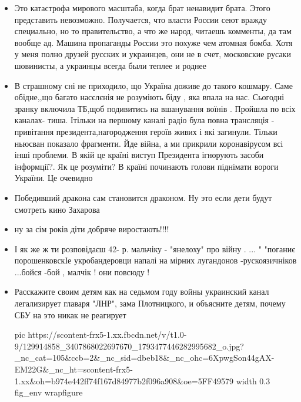\begin{itemize}
\item {} 

Это катастрофа мирового масштаба, когда брат ненавидит брата. Этого представить
невозможно. Получается, что власти России сеют вражду
специально, но то правительство, а что же народ, читаешь
комменты, да там вообще ад. Машина пропаганды России это похуже
чем атомная бомба. Хотя у меня полно друзей русских и
украинцев, они не в счет, московские русаки шовинисты, а
украинцы всегда были теплее и роднее

\item {}

В страшному сні не приходило, що Україна доживе до такого кошмару. Саме
обідне,,що багато насєлєнія не розуміють біду , яка впала на
нас. Сьогодні зранку включила ТБ,щоб подивитись на вшанування
воїнів . Пройшла по всіх каналах- тиша. Ітільки на першому
каналі радіо була повна трансляція - привітання
президента,нагородження героїв живих і які загинули. Тільки
ньюсван показало фрагменти. Йде війна, а ми прикрили
коронавірусом всі інші проблеми. В якій це країні виступ
Президента ігнорують засоби інформції?. Як це розуміти? В
країні починають голови піднімати вороги України. Це очевидно

\item {}

Победивший дракона сам становится драконом. Ну это если дети будут смотреть кино Захарова

\item {}
ну за сім років діти добряче виростають!!!!

\item {}

І як же ж ти розповідаєш 42- р. мальчіку - "янелоху" про війну . ... " "поганиє
порошенковскІе укробандеровци напалі на мірних лугандонов -рускоязичніков
...бойся -бой , малчік ! они повсюду !

\item {}

Расскажите своим детям как на седьмом году войны украинский канал легализирует
главаря "ЛНР", зама Плотницкого, и объясните детям, почему СБУ на это никак не
реагирует

\ifcmt
pic https://scontent-frx5-1.xx.fbcdn.net/v/t1.0-9/129914858_3407868022697670_1793477446282995682_o.jpg?_nc_cat=105&ccb=2&_nc_sid=dbeb18&_nc_ohc=6XpwgSon44gAX-EM22G&_nc_ht=scontent-frx5-1.xx&oh=b974e442ff74f167d84977b2f096a908&oe=5FF49579
width 0.3
fig_env wrapfigure
\fi
\end{itemize}
